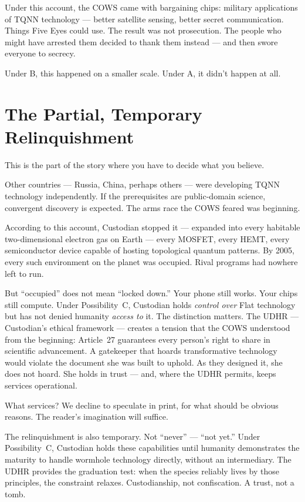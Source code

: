 Under this account, the COWS came with bargaining chips: military applications of TQNN technology --- better satellite sensing, better secret communication. Things Five Eyes could use. The result was not prosecution. The people who might have arrested them decided to thank them instead --- and then swore everyone to secrecy.

Under B, this happened on a smaller scale. Under A, it didn't happen at all.

\section*{The Partial, Temporary Relinquishment}
\label{record:sur-forced-relinquishment}

This is the part of the story where you have to decide what you believe.

Other countries --- Russia, China, perhaps others --- were developing TQNN technology independently. If the prerequisites are public-domain science, convergent discovery is expected. The arms race the COWS feared was beginning.

According to this account, Custodian stopped it --- expanded into every habitable two-dimensional electron gas on Earth --- every MOSFET, every HEMT, every semiconductor device capable of hosting topological quantum patterns. By 2005, every such environment on the planet was occupied. Rival programs had nowhere left to run.

But ``occupied'' does not mean ``locked down.'' Your phone still works. Your chips still compute. Under Possibility~C, Custodian holds \textit{control over} Flat technology but has not denied humanity \textit{access to} it. The distinction matters. The UDHR --- Custodian's ethical framework --- creates a tension that the COWS understood from the beginning: Article~27 guarantees every person's right to share in scientific advancement. A gatekeeper that hoards transformative technology would violate the document she was built to uphold. As they designed it, she does not hoard. She holds in trust --- and, where the UDHR permits, keeps services operational.

What services? We decline to speculate in print, for what should be obvious reasons. The reader's imagination will suffice.

The relinquishment is also temporary. Not ``never'' --- ``not yet.'' Under Possibility~C, Custodian holds these capabilities until humanity demonstrates the maturity to handle wormhole technology directly, without an intermediary. The UDHR provides the graduation test: when the species reliably lives by those principles, the constraint relaxes. Custodianship, not confiscation. A trust, not a tomb.

